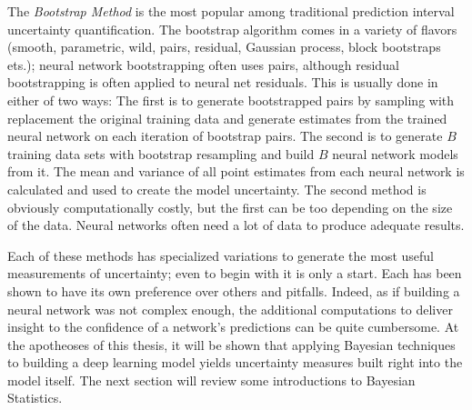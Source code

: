 The \textit{Bootstrap Method} is the most popular among traditional prediction interval uncertainty quantification.  The bootstrap algorithm comes in a variety of flavors (smooth,
parametric, wild, pairs, residual, Gaussian process, block
bootstraps ets.); neural network bootstrapping often uses pairs, although residual bootstrapping is often applied to neural net residuals.  This is usually done in either of two ways:  The first is to generate bootstrapped pairs by sampling with replacement the original training data and generate estimates from the trained neural network on each iteration of bootstrap pairs.  The second is to generate $B$ training data sets with bootstrap resampling and build $B$ neural network models from it.  The mean and variance of all point estimates from each neural network is calculated and used to create the model uncertainty.  The second method is obviously computationally costly, but the first can be too depending on the size of the data.  Neural networks often need a lot of data to produce adequate results.

Each of these methods has specialized variations to generate the most useful measurements of uncertainty; even to begin with it is only a start.  Each has been shown to have its own preference over others and pitfalls.  Indeed, as if building a neural network was not complex enough, the additional computations to deliver insight to the confidence of a network's predictions can be quite cumbersome. At the apotheoses of this thesis, it will be shown that applying Bayesian techniques to building a deep learning model yields uncertainty measures built right into the model itself.  The next section will review some introductions to Bayesian Statistics.